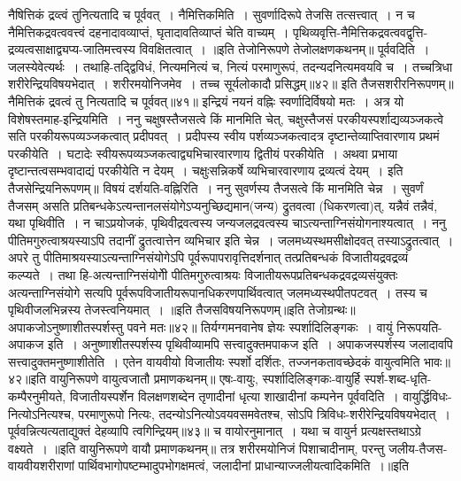 नैषित्तिकं द्रव्त्वं तुनित्यतादि च पूर्ववत्~।
नैमित्तिकमिति~। सुवर्णादिरूपे तेजसि तत्सत्त्वात्~। न च नैमित्तिकद्रवत्ववत्त्वं दहनादावव्याप्तं, घृतादावतिव्याप्तं चेति वाच्यम्~। पृथिव्यवृत्ति-नैमित्तिकद्रवत्ववद्वृत्ति-
द्रव्यत्वसाक्षाद्व्यप्य-जातिमत्त्वस्य विवक्षितत्वात्~।
॥इति तेजोनिरूपणे तेजोलक्षणकथनम्॥
पूर्ववदिति~। जलस्येवेत्यर्थः~। तथाहि-तद्द्विविधं, नित्यमनित्यं च, नित्यं परमाणुरूपं, तदन्यदनित्यमवयवि च~। तच्चत्रिधा शरीरेन्द्रियविषयभेदात्~।
शरीरमयोनिजमेव~। तच्च सूर्यलोकादौ प्रसिद्धम्॥४२॥
इति तैजसशरीरनिरूपणम्॥
नैमित्तिकं द्रवत्वं तु नित्यतादि च पूर्ववत्॥४१॥
इन्द्रियं नयनं वह्निः स्वर्णादिर्विषयो मतः~।
अत्र यो विशेषस्तमाह-इन्द्रियमिति~। ननु चक्षुषस्तैजसत्वे किं मानमिति चेत्, चक्षुस्तैजसं परकीयस्पर्शाद्यव्यञ्जकत्वे सति परकीयरूपव्यञ्जकत्वात् प्रदीपवत्~।
प्रदीपस्य स्वीय पर्शव्यञ्जकत्वादत्र दृष्टान्तेव्याप्तिवारणाय प्रथमं परकीयेति~। घटादेः स्वीयरूपव्यञ्जकत्वाद्व्यभिचारवारणाय द्वितीयं परकीयेति~।
अथवा प्रभाया दृष्टान्तत्वसम्भवादाद्यं परकीयेति न देयम्~। चक्षुःसन्निकर्षे व्यभिचारवारणाय द्रव्यत्वं देयम्~। इति तैजसेन्द्रियनिरूपणम्॥
विषयं दर्शयति-वह्निरिति~। ननु सुवर्णस्य तैजसत्वे किं मानमिति चेन्न~। सुवर्णं तैजसम् असति प्रतिबन्धकेऽत्यन्तानलसंयोगेऽप्यनुच्छिद्यमान(जन्य) द्रुतवत्वा
(धिकरणत्वा)त्, यन्नैवं तन्नैवं, यथा पृथिवीति~। न चाऽप्रयोजकं, पृथिवीद्रवत्वस्य जन्यजलद्रवत्वस्य चाऽत्यन्ताग्निसंयोगनाश्यत्वात्~। ननु पीतिमगुरुत्वाश्रयस्याऽपि तदानीं
द्रुतत्वात्तेन व्यभिचार इति चेन्न~। जलमध्यस्थमसीक्षोदवत् तस्याऽद्रुतत्वात्~।
अपरे तु पीतिमाश्रयस्याऽत्यन्ताग्निसंयोगेऽपि पूर्वरूपापरावृत्तिदर्शनात् तत्प्रतिबन्धकं विजातीयद्रवद्रव्यं कल्प्यते~। तथा हि-अत्यन्ताग्निसंयोगीे पीतिमगुरुत्वाश्रयः
विजातीयरूपप्रतिबन्धकद्रवद्रव्यसंयुक्तः अत्यन्ताग्निसंयोगे सत्यपि पूर्वरूपविजातीयरूपानधिकरणपार्थिवत्वात् जलमध्यस्थपीतपटवत्~। तस्य च पृथिवीजलभिन्नस्य तेजस्त्वनियमात्~।
॥इति तैजसविषयनिरूपणम्॥इति तेजोग्रन्थः॥
अपाकजोऽनुष्णाशीतस्पर्शस्तु पवने मतः॥४२॥
तिर्यग्गमनवानेष ज्ञेयः स्पर्शादिलिङ्गकः~।
वायुं निरूपयति-अपाकज इति~। अनुष्णाशीतस्पर्शस्य पृथिवीव्यामपि सत्त्वादुक्तमपाकज इति~। अपाकजस्पर्शस्य जलादावपि सत्त्वादुक्तमनुष्णाशीतेति~। एतेन
वायवीयो विजातीयः स्पर्शो दर्शितः, तज्जनकतावच्छेदकं वायुत्वमिति भावः॥४२॥इति वायुनिरूपणे वायुत्वजातौ प्रमाणकथनम्॥
एषः-वायुः, स्पर्शादिलिङ्गकः-वायुर्हि स्पर्श-शब्द-धृति-कम्पैरनुमीयते, विजातीयस्पर्शेन विलक्षणशब्देन तृणादीनां धृत्या शाखादीनां कम्पनेन पूर्ववदिति~। वायुर्द्धिविधः-
नित्योऽनित्यश्च, परमाणुरूपो नित्यः, तदन्योऽनित्योऽवयवसमवेतश्च, सोऽपि त्रिविधः-शरीरेन्द्रियविषयभेदात्~।
पूर्ववन्नित्यत्यताद्युक्तं देहव्यापि त्वगिन्द्रियम्॥४३॥
च वायोरनुमानात्~। यथा च वायुर्न प्रत्यक्षस्तथाऽग्रे वक्ष्यते~।
॥इति वायुनिरूपणे वायौ प्रमाणकथनम्॥
तत्र शरीरमयोनिजं पिशाचादीनाम्, परन्तु जलीय-तैजस-वायवीयशरीराणां पार्थिवभागोपष्टम्भादुपभोगक्षमत्वं, जलादीनां प्राधान्याज्जलीयत्वादिकमिति~।॥इति
